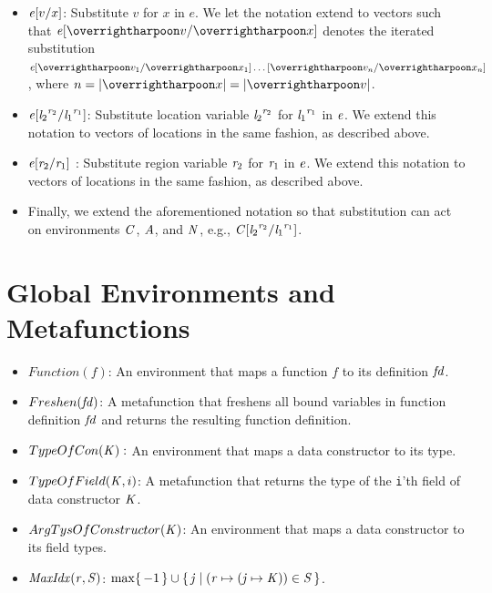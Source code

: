 \documentclass[showabstract,showacknowledgments,showpreface,showdedication]{iuphd}
\theoremstyle{nonumberplain}
\newcommand{\il}[1]{\lstinline[style=inline,mathescape=true];#1;}
\begin{document}
%
\begin{itemize}
\item $\subst{\EXPR}{x}{v}$: Substitute $v$ for $x$ in $e$. We let the notation extend to vectors such that
$\subst{\EXPR}{\overharpoon{x}}{\overharpoon{v}}$ denotes the iterated substitution $\subst{\EXPR}{\overharpoon{x_1}}{\overharpoon{v_1}} \ldots \subst{}{\overharpoon{x_n}}{\overharpoon{v_n}}$, where $n = |\overharpoon{x}| = |\overharpoon{v}|$.

\item $\subst{\EXPR}{\locreg{\loc_1}{\reg_1}}{\locreg{\loc_2}{\reg_2}}$: Substitute location variable $\locreg{\loc_2}{\reg_2}$ for $\locreg{\loc_1}{\reg_1}$ in $\EXPR$. We extend this notation to vectors of locations in the same fashion, as described above.

\item $\subst{\EXPR}{\reg_1}{\reg_2}$ : Substitute region variable $\reg_2$ for $\reg_1$ in $\EXPR$. We extend this notation to vectors of locations in the same fashion, as described above.

\item Finally, we extend the aforementioned notation so that
  substitution can act on environments $\CENV$, $\AENV$, and $\NENV$,
  e.g.,
  $\subst{\CENV}{\locreg{\loc_1}{\reg_1}}{\locreg{\loc_2}{\reg_2}}$.
\end{itemize}


\section{Global Environments and Metafunctions}

\begin{itemize}
\item $Function(f)$: An environment that maps a function $f$ to its definition $\FD$.

\item $Freshen(\FD)$: A metafunction that freshens all bound variables in function definition
$\FD$ and returns the resulting function definition.

\item $TypeOfCon(\DC):$ An environment that maps a data constructor to its type.

\item $TypeOfField(\DC,i)$: A metafunction that returns the type of the \il{i}'th field
of data constructor $\DC$.

\item $ArgTysOfConstructor(\DC)$: An environment that maps a data constructor to its field types.

\item $\allocptr{\reg}{\STOR}$: $\max \set{-1} \cup \set{ \indj \; | \; {(\reg \mapsto (\indj \mapsto \DC)) \in \STOR}}$.
\end{itemize}
\end{document}

